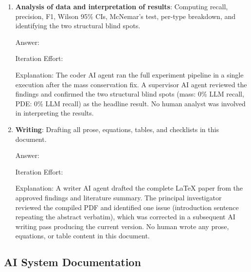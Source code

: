 \documentclass{article}
\begin{document}
\begin{enumerate}
\item \textbf{Analysis of data and interpretation of results}: Computing
  recall, precision, F1, Wilson 95\% CIs, McNemar's test, per-type breakdown,
  and identifying the two structural blind spots.

  Answer: \involvementD{}

  Iteration Effort: \iterationLow{}

  Explanation: The coder AI agent ran the full experiment pipeline in a single
  execution after the mass conservation fix. A supervisor AI agent reviewed the
  findings and confirmed the two structural blind spots (mass: 0\% LLM recall,
  PDE: 0\% LLM recall) as the headline result. No human analyst was involved in
  interpreting the results.

\item \textbf{Writing}: Drafting all prose, equations, tables, and checklists
  in this document.

  Answer: \involvementD{}

  Iteration Effort: \iterationLow{}

  Explanation: A writer AI agent drafted the complete LaTeX paper from the
  approved findings and literature summary. The principal investigator reviewed
  the compiled PDF and identified one issue (introduction sentence repeating the
  abstract verbatim), which was corrected in a subsequent AI writing pass
  producing the current version. No human wrote any prose, equations, or table
  content in this document.

\end{enumerate}

\subsection*{AI System Documentation}
\end{document}
